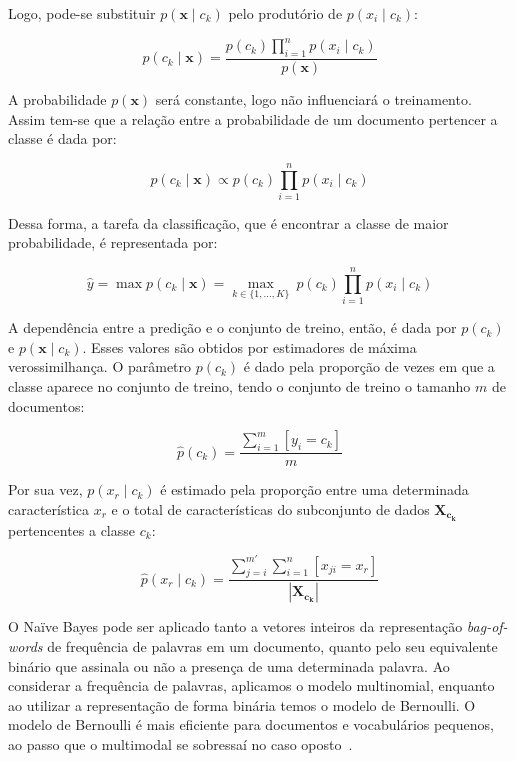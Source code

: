 Logo, pode-se substituir $p(\mathbf{x} \mid c_k)$ pelo produtório de
$p(x_i \mid c_k)$:

\begin{equation}
    p(c_k \mid \mathbf{x}) = \frac{p(c_k) \prod_{i=1}^n p(x_i \mid c_k)}{p(\mathbf{x})}
\end{equation}

A probabilidade $p(\mathbf{x})$ será constante, logo não influenciará o
treinamento.
Assim tem-se que a relação entre a probabilidade de um documento
pertencer a classe é dada por:

\begin{equation}
    p(c_k \mid \mathbf{x}) \propto p(c_k) \prod_{i=1}^n p(x_i \mid c_k)
\end{equation}

Dessa forma, a tarefa da classificação, que é encontrar a classe de maior
probabilidade, é representada por:

\begin{equation}
    \hat{y} = \operatorname{max} p(c_k \mid \mathbf{x}) = \underset{k \in \{1, \dots, K\}}{\operatorname{max}} \ p(c_k) \displaystyle\prod_{i=1}^n p(x_i \mid c_k)
\end{equation}

A dependência entre a predição e o conjunto de treino, então, é dada por $p(c_k)$
e $p(\mathbf{x} \mid c_k)$.
Esses valores são obtidos por estimadores de máxima verossimilhança.
O parâmetro $p(c_k)$ é dado pela proporção de vezes em que a classe aparece no
conjunto de treino, tendo o conjunto de treino o tamanho $m$ de documentos:

\begin{equation}
    \hat{p}(c_k) = \frac{\sum_{i=1}^m [y_i = c_k]}{m}
\end{equation}

Por sua vez, $p(x_r \mid c_k)$ é estimado pela proporção entre uma determinada
característica $x_r$ e o total de características do subconjunto de dados
$\mathbf{X_{c_k}}$ pertencentes a classe $c_k$:

\begin{equation}
    \hat{p}(x_r \mid c_k) = \frac{\sum_{j=i}^{m'} \sum_{i=1}^n [x_{ji} = x_r]}{|\mathbf{X_{c_k}}|}
\end{equation}

O Naïve Bayes pode ser aplicado tanto a vetores inteiros da representação
\textit{bag-of-words} de frequência de palavras em um documento, quanto pelo seu
equivalente binário que assinala ou não a presença de uma determinada palavra.
Ao considerar a frequência de palavras, aplicamos o modelo multinomial, enquanto
ao utilizar a representação de forma binária temos o modelo de Bernoulli.
O modelo de Bernoulli é mais eficiente para documentos e vocabulários pequenos,
ao passo que o multimodal se sobressaí no caso oposto~\cite{schutze08}.

